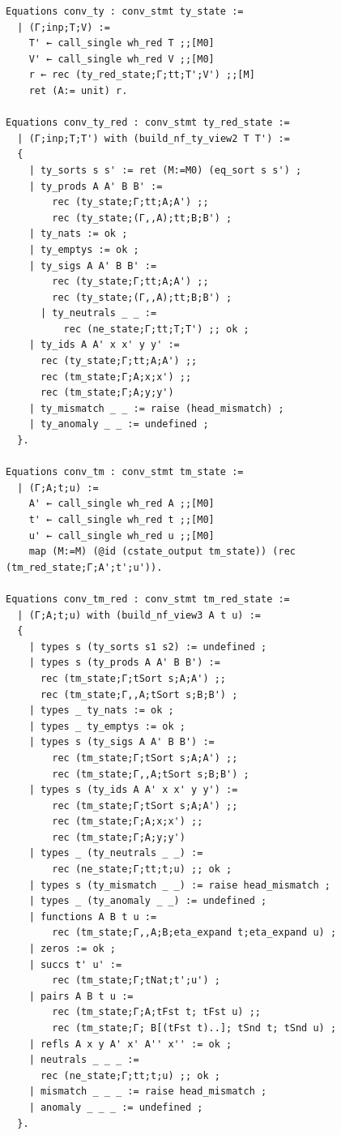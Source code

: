 \documentclass[10pt,a4paper]{amsart}
\begin{document}
\begin{lstlisting}
Equations conv_ty : conv_stmt ty_state :=
  | (Γ;inp;T;V) :=
    T' ← call_single wh_red T ;;[M0]
    V' ← call_single wh_red V ;;[M0]
    r ← rec (ty_red_state;Γ;tt;T';V') ;;[M]
    ret (A:= unit) r.

Equations conv_ty_red : conv_stmt ty_red_state :=
  | (Γ;inp;T;T') with (build_nf_ty_view2 T T') :=
  {
    | ty_sorts s s' := ret (M:=M0) (eq_sort s s') ;
    | ty_prods A A' B B' :=
        rec (ty_state;Γ;tt;A;A') ;;
        rec (ty_state;(Γ,,A);tt;B;B') ;
    | ty_nats := ok ;
    | ty_emptys := ok ;
    | ty_sigs A A' B B' :=
        rec (ty_state;Γ;tt;A;A') ;;
        rec (ty_state;(Γ,,A);tt;B;B') ;
      | ty_neutrals _ _ :=
          rec (ne_state;Γ;tt;T;T') ;; ok ;
    | ty_ids A A' x x' y y' :=
      rec (ty_state;Γ;tt;A;A') ;;
      rec (tm_state;Γ;A;x;x') ;;
      rec (tm_state;Γ;A;y;y')
    | ty_mismatch _ _ := raise (head_mismatch) ;
    | ty_anomaly _ _ := undefined ;
  }.

Equations conv_tm : conv_stmt tm_state :=
  | (Γ;A;t;u) :=
    A' ← call_single wh_red A ;;[M0]
    t' ← call_single wh_red t ;;[M0]
    u' ← call_single wh_red u ;;[M0]
    map (M:=M) (@id (cstate_output tm_state)) (rec (tm_red_state;Γ;A';t';u')).

Equations conv_tm_red : conv_stmt tm_red_state :=
  | (Γ;A;t;u) with (build_nf_view3 A t u) :=
  {
    | types s (ty_sorts s1 s2) := undefined ;
    | types s (ty_prods A A' B B') :=
      rec (tm_state;Γ;tSort s;A;A') ;;
      rec (tm_state;Γ,,A;tSort s;B;B') ;
    | types _ ty_nats := ok ;
    | types _ ty_emptys := ok ;
    | types s (ty_sigs A A' B B') :=
        rec (tm_state;Γ;tSort s;A;A') ;;
        rec (tm_state;Γ,,A;tSort s;B;B') ;
    | types s (ty_ids A A' x x' y y') :=
        rec (tm_state;Γ;tSort s;A;A') ;;
        rec (tm_state;Γ;A;x;x') ;;
        rec (tm_state;Γ;A;y;y')
    | types _ (ty_neutrals _ _) :=
        rec (ne_state;Γ;tt;t;u) ;; ok ;
    | types s (ty_mismatch _ _) := raise head_mismatch ;
    | types _ (ty_anomaly _ _) := undefined ;
    | functions A B t u :=
        rec (tm_state;Γ,,A;B;eta_expand t;eta_expand u) ;
    | zeros := ok ;
    | succs t' u' :=
        rec (tm_state;Γ;tNat;t';u') ;
    | pairs A B t u :=
        rec (tm_state;Γ;A;tFst t; tFst u) ;;
        rec (tm_state;Γ; B[(tFst t)..]; tSnd t; tSnd u) ;
    | refls A x y A' x' A'' x'' := ok ;
    | neutrals _ _ _ :=
      rec (ne_state;Γ;tt;t;u) ;; ok ;
    | mismatch _ _ _ := raise head_mismatch ;
    | anomaly _ _ _ := undefined ;
  }.


\end{lstlisting}
\end{document}
